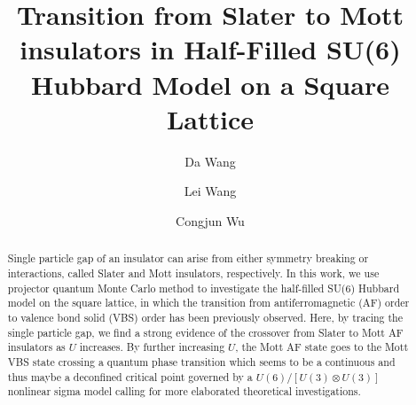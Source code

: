 \documentclass[twocolumn,superscriptaddress]{revtex4-1}
\begin{document}
\title{Transition from Slater to Mott insulators in Half-Filled SU(6) Hubbard Model on a Square Lattice}
\author{Da Wang} %
\author{Lei Wang} %
\author{Congjun Wu} %
\begin{abstract}
    Single particle gap of an insulator can arise from either symmetry breaking or interactions, called Slater and Mott insulators, respectively. In this work, we use projector quantum Monte Carlo method to investigate the half-filled SU(6) Hubbard model on the square lattice, in which the transition from antiferromagnetic (AF) order to valence bond solid (VBS) order has been previously observed. Here, by tracing the single particle gap, we find a strong evidence of the crossover from Slater to Mott AF insulators as $U$ increases. By further increasing $U$, the Mott AF state goes to the Mott VBS state crossing a quantum phase transition which seems to be a continuous and thus maybe a deconfined critical point governed by a $U(6)/[U(3)\otimes U(3)]$ nonlinear sigma model calling for more elaborated theoretical investigations. 
\end{abstract}
\maketitle
\end{document}

